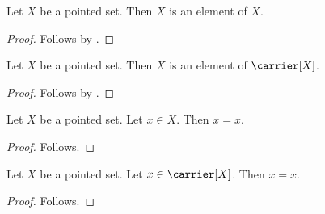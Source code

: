 \begin{proposition}\label{pointed_self_element}
    Let $X$ be a pointed set.
    Then $X$ is an element of $X$.
\end{proposition}
\begin{proof}
    Follows by \auto.
\end{proof}

\begin{proposition}\label{pointed_self_element_explicit}
    Let $X$ be a pointed set.
    Then $X$ is an element of $\carrier[X]$.
\end{proposition}
\begin{proof}
    Follows by \auto.
\end{proof}

\begin{proposition}\label{pointed_header_member}
    Let $X$ be a pointed set.
    Let $x \in X$.
    Then $x = x$.
\end{proposition}
\begin{proof}
    Follows.
\end{proof}

\begin{proposition}\label{pointed_header_member_explicit}
    Let $X$ be a pointed set.
    Let $x \in \carrier[X]$.
    Then $x = x$.
\end{proposition}
\begin{proof}
    Follows.
\end{proof}
